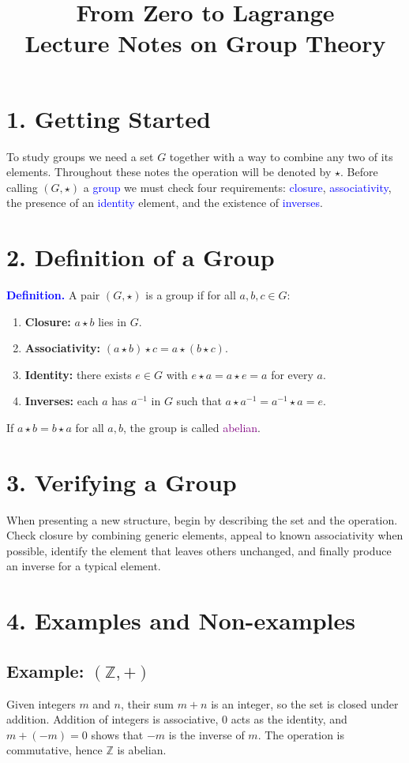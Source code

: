 \documentclass[12pt]{article}
\title{From Zero to Lagrange\\\small Lecture Notes on Group Theory}
\author{}
\date{}
\begin{document}
\maketitle

\section*{1. Getting Started}
To study groups we need a set $G$ together with a way to combine any two of its elements.
Throughout these notes the operation will be denoted by $\star$.
Before calling $(G,\star)$ a \textcolor{blue}{group} we must check four requirements: \textcolor{blue}{closure}, \textcolor{blue}{associativity}, the presence of an \textcolor{blue}{identity} element, and the existence of \textcolor{blue}{inverses}.

\section*{2. Definition of a Group}
\textcolor{blue}{\textbf{Definition.}} A pair $(G,\star)$ is a group if for all $a,b,c\in G$:
\begin{enumerate}
  \item \textbf{Closure:} $a\star b$ lies in $G$.
  \item \textbf{Associativity:} $(a\star b)\star c = a\star(b\star c)$.
  \item \textbf{Identity:} there exists $e\in G$ with $e\star a=a\star e=a$ for every $a$.
  \item \textbf{Inverses:} each $a$ has $a^{-1}$ in $G$ such that $a\star a^{-1}=a^{-1}\star a=e$.
\end{enumerate}
If $a\star b=b\star a$ for all $a,b$, the group is called \textcolor{purple}{abelian}.

\section*{3. Verifying a Group}
When presenting a new structure, begin by describing the set and the operation.
Check closure by combining generic elements, appeal to known associativity when possible, identify the element that leaves others unchanged, and finally produce an inverse for a typical element.

\section*{4. Examples and Non-examples}
\subsection*{Example: $(\mathbb{Z},+)$}
Given integers $m$ and $n$, their sum $m+n$ is an integer, so the set is closed under addition.
Addition of integers is associative, $0$ acts as the identity, and $m+(-m)=0$ shows that $-m$ is the inverse of $m$.
The operation is commutative, hence $\mathbb{Z}$ is abelian.
\end{document}
